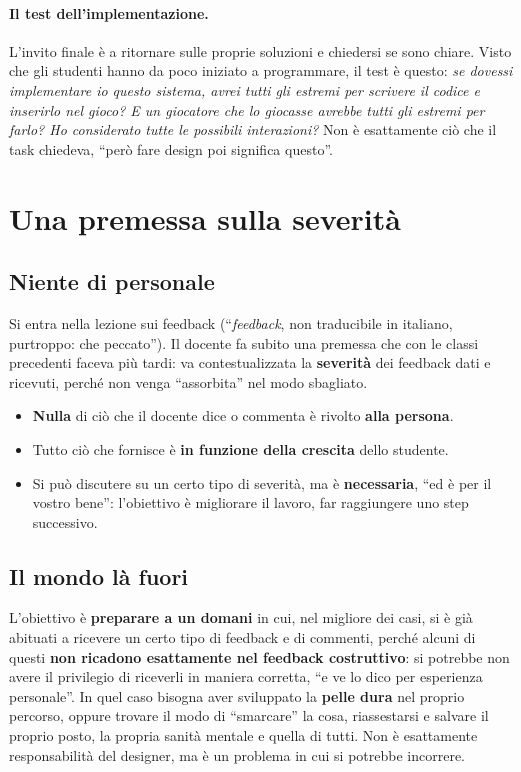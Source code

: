 \paragraph{Il test dell'implementazione.} L'invito finale è a ritornare sulle
proprie soluzioni e chiedersi se sono chiare. Visto che gli studenti hanno
da poco iniziato a programmare, il test è questo: \emph{se dovessi
implementare io questo sistema, avrei tutti gli estremi per scrivere il
codice e inserirlo nel gioco? E un giocatore che lo giocasse avrebbe tutti
gli estremi per farlo? Ho considerato tutte le possibili interazioni?} Non è
esattamente ciò che il task chiedeva, ``però fare design poi significa
questo''.

\section{Una premessa sulla severità}
\label{gd10:sec:premessa}

\subsection{Niente di personale}

Si entra nella lezione sui feedback (``\emph{feedback}, non traducibile in
italiano, purtroppo: che peccato''). Il docente fa subito una premessa che
con le classi precedenti faceva più tardi: va contestualizzata la
\textbf{severità} dei feedback dati e ricevuti, perché non venga
``assorbita'' nel modo sbagliato.
\begin{itemize}
  \item \textbf{Nulla} di ciò che il docente dice o commenta è rivolto
        \textbf{alla persona}.
  \item Tutto ciò che fornisce è \textbf{in funzione della crescita} dello
        studente.
  \item Si può discutere su un certo tipo di severità, ma è
        \textbf{necessaria}, ``ed è per il vostro bene'': l'obiettivo è
        migliorare il lavoro, far raggiungere uno step successivo.
\end{itemize}

\subsection{Il mondo là fuori}

L'obiettivo è \textbf{preparare a un domani} in cui, nel migliore dei casi,
si è già abituati a ricevere un certo tipo di feedback e di commenti, perché
alcuni di questi \textbf{non ricadono esattamente nel feedback costruttivo}:
si potrebbe non avere il privilegio di riceverli in maniera corretta, ``e ve
lo dico per esperienza personale''. In quel caso bisogna aver sviluppato la
\textbf{pelle dura} nel proprio percorso, oppure trovare il modo di
``smarcare'' la cosa, riassestarsi e salvare il proprio posto, la propria
sanità mentale e quella di tutti. Non è esattamente responsabilità del
designer, ma è un problema in cui si potrebbe incorrere.

